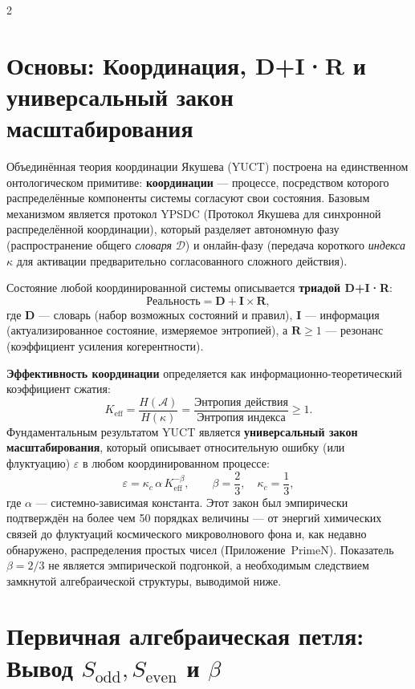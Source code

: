\documentclass[12pt,a4paper]{article}
\newcommand{\Keff}{K_{\mathrm{eff}}}
\newcommand{\kappac}{\kappa_c}
\begin{document}
	\vspace{0.4cm}
	
	\begin{multicols}{2}
		
		\section{Основы: Координация, D+I·R и универсальный закон масштабирования}
		
		Объединённая теория координации Якушева (YUCT) построена на единственном онтологическом примитиве: \textbf{координации} — процессе, посредством которого распределённые компоненты системы согласуют свои состояния. Базовым механизмом является протокол YPSDC (Протокол Якушева для синхронной распределённой координации), который разделяет автономную фазу (распространение общего \textit{словаря} \(\mathcal{D}\)) и онлайн-фазу (передача короткого \textit{индекса} \(\kappa\) для активации предварительно согласованного сложного действия).
		
		Состояние любой координированной системы описывается \textbf{триадой D+I·R}:
		\[
		\text{Реальность} = \mathbf{D} + \mathbf{I} \times \mathbf{R},
		\]
		где \(\mathbf{D}\) — словарь (набор возможных состояний и правил), \(\mathbf{I}\) — информация (актуализированное состояние, измеряемое энтропией), а \(\mathbf{R} \ge 1\) — резонанс (коэффициент усиления когерентности).
		
		\textbf{Эффективность координации} определяется как информационно-теоретический коэффициент сжатия:
		\[
		\Keff = \frac{H(\mathcal{A})}{H(\kappa)} = \frac{\text{Энтропия действия}}{\text{Энтропия индекса}} \ge 1.
		\]
		Фундаментальным результатом YUCT является \textbf{универсальный закон масштабирования}, который описывает относительную ошибку (или флуктуацию) \(\varepsilon\) в любом координированном процессе:
		\[
		\boxed{\varepsilon = \kappac \, \alpha \, \Keff^{-\beta}, \qquad \beta = \frac{2}{3}, \quad \kappac = \frac{1}{3}},
		\]
		где \(\alpha\) — системно-зависимая константа. Этот закон был эмпирически подтверждён на более чем 50 порядках величины — от энергий химических связей до флуктуаций космического микроволнового фона и, как недавно обнаружено, распределения простых чисел (Приложение~PrimeN). Показатель \(\beta = 2/3\) не является эмпирической подгонкой, а необходимым следствием замкнутой алгебраической структуры, выводимой ниже.
		
		\section{Первичная алгебраическая петля: Вывод \(S_{\mathrm{odd}}, S_{\mathrm{even}}\) и \(\beta\)}
		

\end{multicols}
\end{document}

